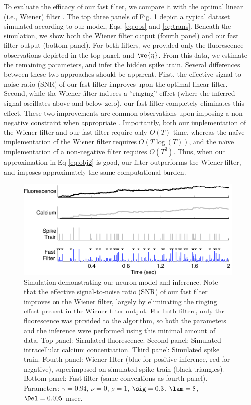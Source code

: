 \documentclass[12pt]{article}
\begin{document}
To evaluate the efficacy of our fast filter, we compare it with the optimal linear (i.e., Wiener) filter \cite{Wiener49}. The top three panels of Fig. \ref{fig:schem} depict a typical dataset simulated according to our model, Eqs. \eqref{eq:obs} and \eqref{eq:trans}. Beneath the simulation, we show both the Wiener filter output (fourth panel) and our fast filter output (bottom panel).  For both filters, we provided only the fluorescence observations depicted in the top panel, and $\ve{\eta}$.  From this data, we estimate the remaining parameters, and infer the hidden spike train. Several differences between these two approaches should be apparent.  First, the effective signal-to-noise ratio (SNR) of our fast filter improves upon the optimal linear filter.  Second, while the Wiener filter induces a ``ringing'' effect (where the inferred signal oscillates above and below zero), our fast filter completely eliminates this effect.  These two improvements are common observations upon imposing a non-negative constraint when appropriate \cite{ShumwayStoffer06}.  Importantly, both our implementation of the Wiener filter and our fast filter require only $O(T)$ time, whereas the na\"{i}ve implementation of the Wiener filter requires $O(T \log(T))$, and the na\"{i}ve implementation of a non-negative filter requires $O(T^3)$.  Thus, when our approximation in Eq \eqref{eq:obj2} is good, our filter outperforms the Wiener filter, and imposes approximately the same computational burden.

\begin{figure}
\centering \includegraphics[width=.9\linewidth]{schem}
\caption{Simulation demonstrating our neuron model and inference. Note that the effective signal-to-noise ratio (SNR) of our fast filter improves on the Wiener filter, largely by eliminating the ringing effect present in the Wiener filter output.  For both filters, only the fluorescence was provided to the algorithm, so both the parameters and the inference were performed using this minimal amount of data.  Top panel: Simulated fluorescence. Second panel: Simulated intracellular calcium concentration. Third panel: Simulated spike train.  Fourth panel: Wiener filter (blue for positive inference, red for negative), superimposed on simulated spike train (black triangles).  Bottom panel: Fast filter (same conventions as fourth panel). Parameters:  $\gamma=0.94$, $\nu=0$, $\rho=1$, $\sig=0.3$, $\lam=8$, $\Del=0.005$ msec.} \label{fig:schem}
\end{figure}
\end{document}
